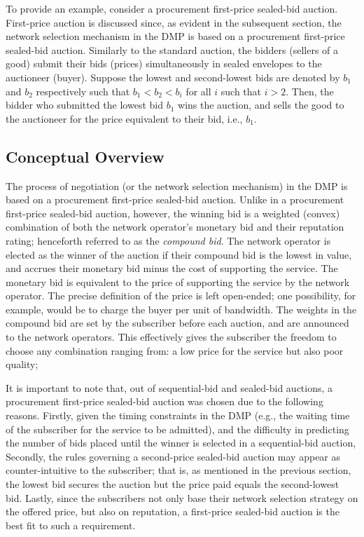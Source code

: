 To provide an example, consider a procurement first-price sealed-bid auction. First-price auction is discussed since, as evident in the subsequent section, the network selection mechanism in the DMP is based on a procurement first-price sealed-bid auction. Similarly to the standard auction, the bidders (sellers of a good) submit their bids (prices) simultaneously in sealed envelopes to the auctioneer (buyer). Suppose the lowest and second-lowest bids are denoted by $b_1$ and $b_2$ respectively such that $b_1 < b_2 < b_i$ for all $i$ such that $i > 2$. Then, the bidder who submitted the lowest bid $b_1$ wins the auction, and sells the good to the auctioneer for the price equivalent to their bid, i.e., $b_1$.

\subsection{Conceptual Overview} %
\label{sub:conceptual_overview_dmp}
The process of negotiation (or the network selection mechanism) in the DMP is based on a procurement first-price sealed-bid auction. Unlike in a procurement first-price sealed-bid auction, however, the winning bid is a weighted (convex) combination of both the network operator's monetary bid and their reputation rating; henceforth referred to as the \emph{compound bid}. The network operator is elected as the winner of the auction if their compound bid is the lowest in value, and accrues their monetary bid minus the cost of supporting the service. The monetary bid is equivalent to the price of supporting the service by the network operator. The precise definition of the price is left open-ended; one possibility, for example, would be to charge the buyer per unit of bandwidth. The weights in the compound bid are set by the subscriber before each auction, and are announced to the network operators. This effectively gives the subscriber the freedom to choose any combination ranging from: a low price for the service but also poor quality; 

It is important to note that, out of sequential-bid and sealed-bid auctions, a procurement first-price sealed-bid auction was chosen due to the following reasons. Firstly, given the timing constraints in the DMP (e.g., the waiting time of the subscriber for the service to be admitted), and the difficulty in predicting the number of bids placed until the winner is selected in a sequential-bid auction,  Secondly, the rules governing a second-price sealed-bid auction may appear as counter-intuitive to the subscriber; that is, as mentioned in the previous section, the lowest bid secures the auction but the price paid equals the second-lowest bid. Lastly, since the subscribers not only base their network selection strategy on the offered price, but also on reputation, a first-price sealed-bid auction is the best fit to such a requirement.

